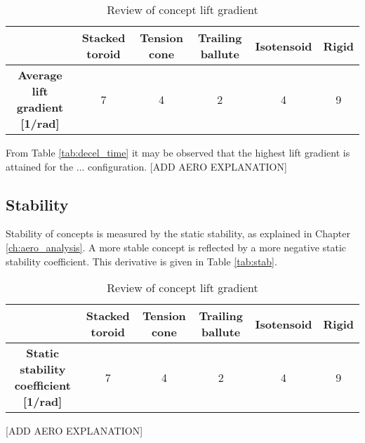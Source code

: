 \begin{table}[h]
\caption{Review of concept lift gradient}
\hspace{-20mm}
\begin{tabular}{|c|c|c|c|c|c|}
\hline
\textbf{}                          & \textbf{Stacked toroid} & \textbf{Tension cone} & \textbf{Trailing ballute} & \textbf{Isotensoid} & \textbf{Rigid} \\ \hline
\textbf{Average lift gradient {[}1/rad{]}} &\cellcolor{green!70} 7  &\cellcolor{yellow!75}  4   &\cellcolor{red!60} 2 & \cellcolor{yellow!75}      4          &\cellcolor{green!70} 9                 \\ \hline
\end{tabular}
\end{table}

From Table \ref{tab:decel_time} it may be observed that the highest lift gradient is attained for the ... configuration. [ADD AERO EXPLANATION]

\subsection{Stability}
Stability of concepts is measured by the static stability, as explained in Chapter \ref{ch:aero_analysis}. A more stable concept is reflected by a more negative static stability coefficient. This derivative is given in Table \ref{tab:stab}.

\begin{table}[h]
\caption{Review of concept lift gradient}
\hspace{-20mm}
\begin{tabular}{|c|c|c|c|c|c|}
\hline
\textbf{}                          & \textbf{Stacked toroid} & \textbf{Tension cone} & \textbf{Trailing ballute} & \textbf{Isotensoid} & \textbf{Rigid} \\ \hline
\textbf{Static stability coefficient {[}1/rad{]}} &\cellcolor{green!70} 7  &\cellcolor{yellow!75}  4   &\cellcolor{red!60} 2 & \cellcolor{yellow!75}      4          &\cellcolor{green!70} 9                 \\ \hline
\end{tabular}
\end{table}

[ADD AERO EXPLANATION]

